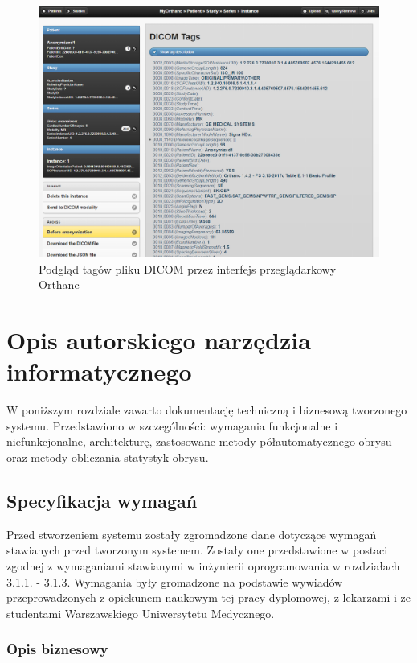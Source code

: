 \documentclass[a4paper,11pt,twoside,openright]{report}
\theoremstyle{definition}
\begin{document}
\begin{figure}[t]
	\center
	\includegraphics[width=1\textwidth]{Orthanc-tags}
	\caption{Podgląd tagów pliku DICOM przez interfejs przeglądarkowy Orthanc}
    	\label{fig:Orthanc-tags}
\end{figure}


\chapter {Opis autorskiego narzędzia informatycznego}

W poniższym rozdziale zawarto dokumentację techniczną i biznesową tworzonego systemu. Przedstawiono w szczególności: wymagania funkcjonalne i niefunkcjonalne, architekturę, zastosowane metody półautomatycznego obrysu oraz metody obliczania statystyk obrysu.

\section {Specyfikacja wymagań}

Przed stworzeniem systemu zostały zgromadzone dane dotyczące wymagań stawianych przed tworzonym systemem. Zostały one przedstawione w postaci zgodnej z wymaganiami stawianymi w inżynierii oprogramowania w rozdziałach 3.1.1. - 3.1.3. Wymagania były gromadzone na podstawie wywiadów przeprowadzonych z opiekunem naukowym tej pracy dyplomowej, z lekarzami i ze studentami Warszawskiego Uniwersytetu Medycznego.

\subsection {Opis biznesowy}
\end{document}
